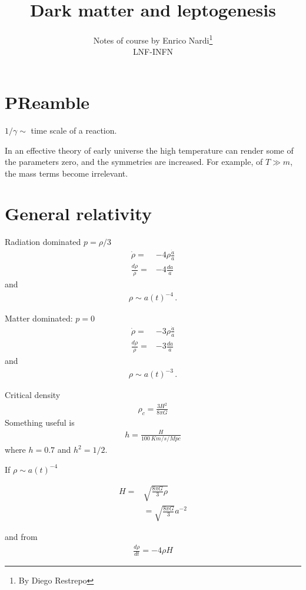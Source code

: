 \documentclass[12pt,letterpaper]{article}
\title{Dark matter and leptogenesis}
\author{Notes of course by Enrico Nardi\footnote{By Diego Restrepo}\\ LNF-INFN}
\begin{document}
\maketitle


\section{PReamble}
$1/\gamma\sim$ time scale of a reaction.

In an effective theory of early universe the high temperature can render some of the parameters zero, and the symmetries are increased. For example, of $T\gg m$, the mass terms become irrelevant.


\section{General relativity}
Radiation dominated $p=\rho/3$
\begin{align*}
  \dot\rho=&-4\rho\frac{\dot{a}}{a}\nonumber\\
  \frac{d\rho}{\rho}=&-4\frac{da}{a}
\end{align*}
and
\begin{align*}
  \rho\sim a(t)^{-4}\,.
\end{align*}

Matter dominated: $p=0$
\begin{align*}
  \dot{\rho}=&-3\rho\frac{\dot{a}}{a}\nonumber\\
  \frac{d\rho}{\rho}=&-3\frac{da}{a}
\end{align*}
and
\begin{align*}
  \rho\sim a(t)^{-3}\,.
\end{align*}

Critical density
\begin{align*}
  \rho_c=\frac{3H^2}{8\pi G}
\end{align*}
Something useful is
\begin{align*}
  h=\frac{H}{\SI{100}{Km/s/Mpc}}
\end{align*}
where $h=0.7$ and $h^2=1/2$.

If  $ \rho\sim a(t)^{-4}$

\begin{align*}
  H=&\sqrt{\frac{8\pi G}{3}\rho}\nonumber\\
&=\sqrt{\frac{8\pi G}{3}}a^{-2}
\end{align*}

and from
\begin{align*}
  \frac{d\rho}{dt}=-4\rho H
\end{align*}
\end{document}
